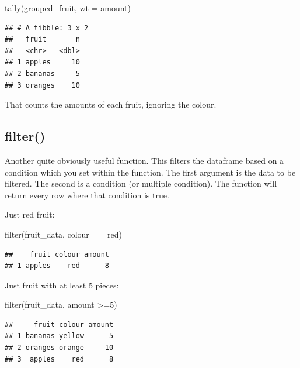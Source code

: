 \documentclass[
]{book}
\newenvironment{Shaded}{\begin{snugshade}}{\end{snugshade}}
\newcommand{\AttributeTok}[1]{\textcolor[rgb]{0.77,0.63,0.00}{#1}}
\newcommand{\DecValTok}[1]{\textcolor[rgb]{0.00,0.00,0.81}{#1}}
\newcommand{\FunctionTok}[1]{\textcolor[rgb]{0.00,0.00,0.00}{#1}}
\newcommand{\NormalTok}[1]{#1}
\newcommand{\SpecialCharTok}[1]{\textcolor[rgb]{0.00,0.00,0.00}{#1}}
\newcommand{\StringTok}[1]{\textcolor[rgb]{0.31,0.60,0.02}{#1}}
\begin{document}
\begin{Shaded}
\begin{Highlighting}[]
\FunctionTok{tally}\NormalTok{(grouped\_fruit, }\AttributeTok{wt =}\NormalTok{ amount)}
\end{Highlighting}
\end{Shaded}

\begin{verbatim}
## # A tibble: 3 x 2
##   fruit       n
##   <chr>   <dbl>
## 1 apples     10
## 2 bananas     5
## 3 oranges    10
\end{verbatim}

That counts the amounts of each fruit, ignoring the colour.

\hypertarget{filter}{%
\subsection{filter()}\label{filter}}

Another quite obviously useful function. This filters the dataframe based on a condition which you set within the function. The first argument is the data to be filtered. The second is a condition (or multiple condition). The function will return every row where that condition is true.

Just red fruit:

\begin{Shaded}
\begin{Highlighting}[]
\FunctionTok{filter}\NormalTok{(fruit\_data, colour }\SpecialCharTok{==} \StringTok{\textquotesingle{}red\textquotesingle{}}\NormalTok{)}
\end{Highlighting}
\end{Shaded}

\begin{verbatim}
##    fruit colour amount
## 1 apples    red      8
\end{verbatim}

Just fruit with at least 5 pieces:

\begin{Shaded}
\begin{Highlighting}[]
\FunctionTok{filter}\NormalTok{(fruit\_data, amount }\SpecialCharTok{\textgreater{}=}\DecValTok{5}\NormalTok{)}
\end{Highlighting}
\end{Shaded}

\begin{verbatim}
##     fruit colour amount
## 1 bananas yellow      5
## 2 oranges orange     10
## 3  apples    red      8
\end{verbatim}
\end{document}
